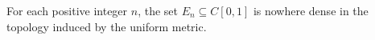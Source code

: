 For each positive integer $n$, the set $E_n \subseteq C[0,1]$ is nowhere dense in the topology induced by the uniform metric.
